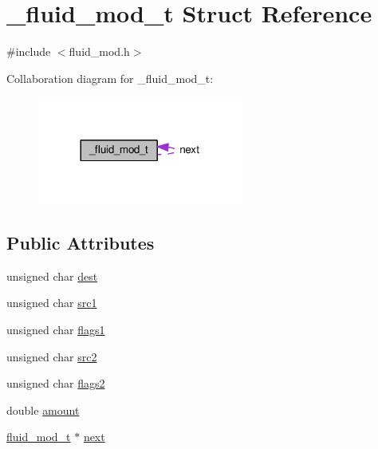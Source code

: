 \hypertarget{struct__fluid__mod__t}{}\section{\+\_\+fluid\+\_\+mod\+\_\+t Struct Reference}
\label{struct__fluid__mod__t}


{\ttfamily \#include $<$fluid\+\_\+mod.\+h$>$}



Collaboration diagram for \+\_\+fluid\+\_\+mod\+\_\+t\+:
\nopagebreak
\begin{figure}[H]
\begin{center}
\leavevmode
\includegraphics[width=192pt]{struct__fluid__mod__t__coll__graph}
\end{center}
\end{figure}
\subsection*{Public Attributes}
\begin{DoxyCompactItemize}
\item 
unsigned char \hyperlink{struct__fluid__mod__t_a1c7d15ae9ad239b578701878b0ffbb08}{dest}
\item 
unsigned char \hyperlink{struct__fluid__mod__t_a199e73690c3e5fdb0e073d05f8237196}{src1}
\item 
unsigned char \hyperlink{struct__fluid__mod__t_adb71cc4a4b81c915f05c1b8d069e3056}{flags1}
\item 
unsigned char \hyperlink{struct__fluid__mod__t_a8f83acd72515a3dc6d6d73089b907685}{src2}
\item 
unsigned char \hyperlink{struct__fluid__mod__t_a38e059fb4214ab59b5f0895d100dfffa}{flags2}
\item 
double \hyperlink{struct__fluid__mod__t_a89680a436126f578594c5981d6c4f2ad}{amount}
\item 
\hyperlink{types_8h_a6c727efab500d6c0c350d4292e9aa5ef}{fluid\+\_\+mod\+\_\+t} $\ast$ \hyperlink{struct__fluid__mod__t_a596143c498657350b1d43cb99a2bc6b0}{next}
\end{DoxyCompactItemize}


